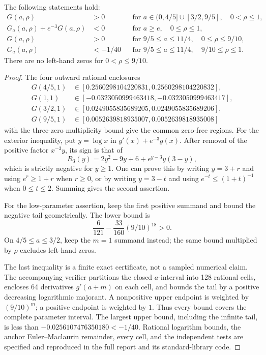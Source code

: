 \begin{lemma}\label{globalphase:inputs}
The following statements hold:
\begin{align*}
 G(a,\rho)&>0 &&\text{for }a\in(0,4/5]\cup[3/2,9/5],\quad0<\rho\leq1,\\
 G_a(a,\rho)+e^{-3}G(a,\rho)&<0 &&\text{for }a\geq e,\quad0\leq\rho\leq1,\\
 G(a,\rho)&>0 &&\text{for }9/5\leq a\leq11/4,\quad0\leq\rho\leq9/10,\\
 G_a(a,\rho)&<-1/40 &&\text{for }9/5\leq a\leq11/4,\quad9/10\leq\rho\leq1.
\end{align*}
There are no left-hand zeros for $0<\rho\leq9/10$.
\end{lemma}
\begin{proof}
The four outward rational enclosures
\begin{align*}
 G(4/5,1)&\in[0.2560298104220831,0.2560298104220832],\\
 G(1,1)&\in[-0.0323050999463418,-0.0323050999463417],\\
 G(3/2,1)&\in[0.0249055835689205,0.0249055835689206],\\
 G(9/5,1)&\in[0.0052639818935007,0.0052639818935008]
\end{align*}
with the three-zero multiplicity bound give the common zero-free regions.
For the exterior inequality, put $y=\log x$ in $g'(x)+e^{-3}g(x)$.
After removal of the positive factor $x^{-3}y$, its sign is that of
\[
 R_3(y)=2y^2-9y+6+e^{y-3}y(3-y),
\]
which is strictly negative for $y\geq1$. One can prove this by writing
$y=3+r$ and using $e^r\geq1+r$ when $r\geq0$, or by writing $y=3-t$
and using $e^{-t}\leq(1+t)^{-1}$ when $0\leq t\leq2$. Summing gives the
second assertion.

For the low-parameter assertion, keep the first positive summand and bound
the negative tail geometrically. The lower bound is
\[
 \frac6{121}-\frac{33}{160}(9/10)^{18}>0.
\]
On $4/5\leq a\leq3/2$, keep the $m=1$ summand instead; the same bound
multiplied by $\rho$ excludes left-hand zeros.

The last inequality is a finite exact certificate, not a sampled numerical
claim. The accompanying verifier partitions the closed $a$-interval into
128 rational cells, encloses 64 derivatives $g'(a+m)$ on each cell, and
bounds the tail by a positive decreasing logarithmic majorant. A nonpositive
upper endpoint is weighted by $(9/10)^m$; a positive endpoint is weighted
by $1$. Thus every bound covers the complete parameter interval. The largest
upper bound, including the infinite tail, is less than
$-0.0256107476350180<-1/40$. Rational logarithm bounds, the anchor
Euler--Maclaurin remainder, every cell, and the independent tests are
specified and reproduced in the full report and its standard-library code.
\end{proof}

